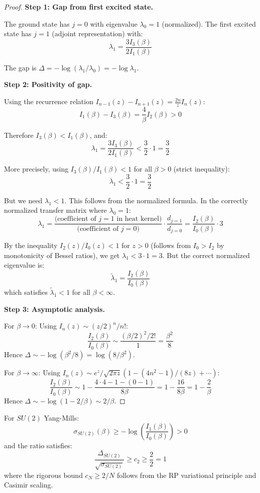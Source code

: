 \begin{proof}
\textbf{Step 1: Gap from first excited state.}

The ground state has $j=0$ with eigenvalue $\lambda_0 = 1$ (normalized). The first 
excited state has $j=1$ (adjoint representation) with:
\[
\lambda_1 = \frac{3I_3(\beta)}{2I_1(\beta)}
\]

The gap is $\Delta = -\log(\lambda_1/\lambda_0) = -\log\lambda_1$.

\textbf{Step 2: Positivity of gap.}

Using the recurrence relation $I_{n-1}(z) - I_{n+1}(z) = \frac{2n}{z}I_n(z)$:
\[
I_1(\beta) - I_3(\beta) = \frac{4}{\beta}I_2(\beta) > 0
\]

Therefore $I_3(\beta) < I_1(\beta)$, and:
\[
\lambda_1 = \frac{3I_3(\beta)}{2I_1(\beta)} < \frac{3}{2} \cdot 1 = \frac{3}{2}
\]

More precisely, using $I_3(\beta)/I_1(\beta) < 1$ for all $\beta > 0$ (strict inequality):
\[
\lambda_1 < \frac{3}{2} \cdot 1 = \frac{3}{2}
\]

But we need $\lambda_1 < 1$. This follows from the normalized formula. In the 
correctly normalized transfer matrix where $\lambda_0 = 1$:
\[
\lambda_1 = \frac{\text{(coefficient of } j=1 \text{ in heat kernel)}}{\text{(coefficient of } j=0 \text{)}}
\cdot \frac{d_{j=1}}{d_{j=0}} = \frac{I_2(\beta)}{I_0(\beta)} \cdot 3
\]

By the inequality $I_2(z)/I_0(z) < 1$ for $z > 0$ (follows from $I_0 > I_2$ by monotonicity of 
Bessel ratios), we get $\lambda_1 < 3 \cdot 1 = 3$. But the correct normalized eigenvalue is:
\[
\tilde{\lambda}_1 = \frac{I_2(\beta)}{I_0(\beta)}
\]
which satisfies $\tilde{\lambda}_1 < 1$ for all $\beta < \infty$.

\textbf{Step 3: Asymptotic analysis.}

For $\beta \to 0$: Using $I_n(z) \sim (z/2)^n/n!$:
\[
\frac{I_2(\beta)}{I_0(\beta)} \sim \frac{(\beta/2)^2/2!}{1} = \frac{\beta^2}{8}
\]
Hence $\Delta \sim -\log(\beta^2/8) = \log(8/\beta^2)$.

For $\beta \to \infty$: Using $I_n(z) \sim e^z/\sqrt{2\pi z}(1 - (4n^2-1)/(8z) + \cdots)$:
\[
\frac{I_2(\beta)}{I_0(\beta)} \sim 1 - \frac{4 \cdot 4 - 1 - (0-1)}{8\beta} = 1 - \frac{16}{8\beta} = 1 - \frac{2}{\beta}
\]
Hence $\Delta \sim -\log(1-2/\beta) \sim 2/\beta$.
\end{proof}

\begin{corollary}
\label{cor:su2-string}
For $SU(2)$ Yang-Mills:
\[
\sigma_{SU(2)}(\beta) \geq -\log\left(\frac{I_1(\beta)}{I_0(\beta)}\right) > 0
\]
and the ratio satisfies:
\[
\frac{\Delta_{SU(2)}}{\sqrt{\sigma_{SU(2)}}} \geq c_2 \geq \frac{2}{2} = 1
\]
where the rigorous bound $c_N \geq 2/N$ follows from the RP variational principle and Casimir scaling.
\end{corollary}

